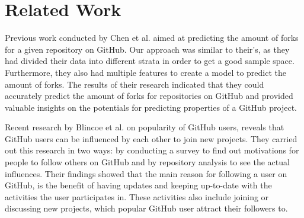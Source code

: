 \section{Related Work}
Previous work conducted by Chen et al.\cite{chen-2014} aimed at predicting the amount of forks for a given repository on GitHub.
Our approach was similar to their's, as they had divided their data into different strata in order to get a good sample space.
Furthermore, they also had multiple features to create a model to predict the amount of forks.
The results of their research indicated that they could accurately predict the amount of forks for repositories on GitHub and provided valuable insights on the potentials for predicting properties of a GitHub project.

Recent research by Blincoe et al.\cite{blincoe-2015} on popularity of GitHub users, reveals that GitHub users can be influenced by each other to join new projects.
They carried out this research in two ways: by conducting a survey to find out motivations for people to follow others on GitHub and by repository analysis to see the actual influences.
Their findings showed that the main reason for following a user on GitHub, is the benefit of having updates and keeping up-to-date with the activities the user participates in.
These activities also include joining or discussing new projects, which popular GitHub user attract their followers to.


